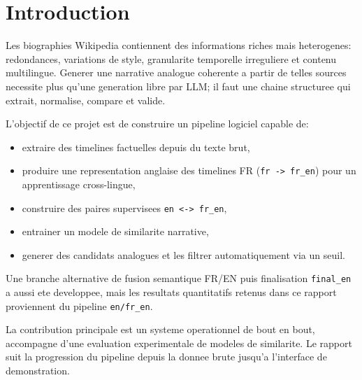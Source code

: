 ﻿\chapter{Introduction}

Les biographies Wikipedia contiennent des informations riches mais heterogenes:
redondances, variations de style, granularite temporelle irreguliere et contenu
multilingue. Generer une narrative analogue coherente a partir de telles sources
necessite plus qu'une generation libre par LLM; il faut une chaine structuree
qui extrait, normalise, compare et valide.

L'objectif de ce projet est de construire un pipeline logiciel capable de:
\begin{itemize}[leftmargin=2em]
  \item extraire des timelines factuelles depuis du texte brut,
  \item produire une representation anglaise des timelines FR
        (\texttt{fr -> fr\_en}) pour un apprentissage cross-lingue,
  \item construire des paires supervisees \texttt{en <-> fr\_en},
  \item entrainer un modele de similarite narrative,
  \item generer des candidats analogues et les filtrer automatiquement via un seuil.
\end{itemize}

Une branche alternative de fusion semantique FR/EN puis finalisation
\texttt{final\_en} a aussi ete developpee, mais les resultats quantitatifs
retenus dans ce rapport proviennent du pipeline \texttt{en/fr\_en}.

La contribution principale est un systeme operationnel de bout en bout,
accompagne d'une evaluation experimentale de modeles de similarite.
Le rapport suit la progression du pipeline depuis la donnee brute jusqu'a
l'interface de demonstration.
